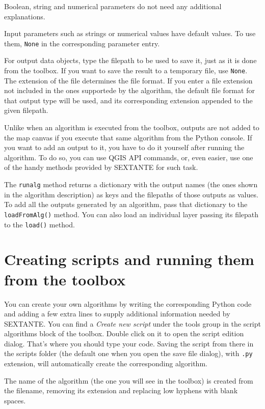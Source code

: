 Boolean, string and numerical parameters do not need any additional explanations.

Input parameters such as strings or numerical values have default values. To use them, \texttt{None} in the corresponding parameter entry.

For output data objects, type the filepath to be used to save it, just as it is done from the toolbox. If you want to save the result to a temporary file, use \texttt{None}. The extension of the file determines the file format. If you enter a file extension not included in the ones supportede by the algorithm, the default file format for that output type will be used, and its corresponding extension appended to the given filepath.

Unlike when an algorithm is executed from the toolbox, outputs are not added to the map canvas if you execute that same algorithm from the Python console. If you want to add an output to it, you have to do it yourself after running the algorithm. To do so, you can use QGIS API commands, or, even easier, use one of the handy methods provided by SEXTANTE for such task.

The \texttt{runalg} method returns a dictionary with the output names (the ones shown in the algorithm description) as keys and the filepaths of those outputs as values. To add all the outputs generated by an algorithm, pass that dictionary to the \texttt{loadFromAlg()} method. You can also load an individual layer passing its filepath to the \texttt{load()} method.


\section{Creating scripts and running them from the toolbox}

You can create your own algorithms by writing the corresponding Python code and adding a few extra lines to supply additional information needed by SEXTANTE. You can find a \emph{Create new script} under the tools group in the script algorithms block of the toolbox. Double click on it to open the script edition dialog. That's where you should type your code. Saving the script from there in the scripts folder (the default one when you open the save file dialog), with \texttt{.py} extension, will automatically create the corresponding algorithm.

The name of the algorithm (the one you will see in the toolbox) is created from the filename, removing its extension and replacing low hyphens with blank spaces.

